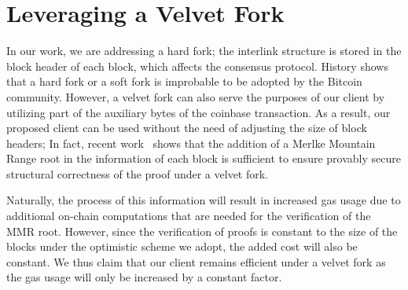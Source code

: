 \section{Leveraging a Velvet Fork}

In our work, we are addressing a hard fork; the interlink structure is stored
in the block header of each block, which affects the consensus protocol.
History shows that a hard fork or a soft fork is improbable to be adopted by
the Bitcoin community. However, a velvet fork can also serve the purposes of
our client by utilizing part of the auxiliary bytes of the coinbase
transaction. As a result, our proposed client can be used without the need of
adjusting the size of block headers; In fact, recent
work~\cite{velvet-nipopows} shows that the addition of a Merlke Mountain Range
root in the information of each block is sufficient to ensure provably secure
structural correctness of the proof under a velvet fork.

Naturally, the process of this information will result in increased gas usage
due to additional on-chain computations that are needed for the verification of
the MMR root. However, since the verification of proofs is constant to the size
of the blocks under the optimistic scheme we adopt, the added cost will also be
constant. We thus claim that our client remains efficient under a velvet fork
as the gas usage will only be increased by a constant factor.
